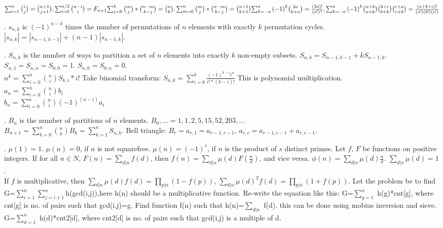 \\
${\sum_{i=1}^{n} {\binom {i}{j}} = {\binom {n+1}{j+1}}}
,  {\sum_{i=0}^{n/2} {\binom {n-i}{i}} = F_{n+1}}\\
{\sum_{j=0}^{k} {\binom {m}{j}}*{\binom {n-m}{k-j}} = {\binom {n}{k}}}
, {\sum_{m=0}^{n} {\binom {m}{j}}*{\binom {n-m}{k-j}} = {\binom {n+1}{k+1}}}\\
{\sum_{k=-a}^{a} {(-1)}^k {\binom {2a}{k+a}} = \frac{(3a)!}{(a!)^3}},  
{\sum_{k=-a}^{a} {(-1)}^k {\binom {a+b}{a+k}}{\binom {b+c}{b+k}}{\binom {c+a}{c+k}} = \frac{(a+b+c)!}{(a!)(b!)(c!)}}$

.
$s_{n,k}$ is $(-1)^{n-k}$ times the number of permutations of $n$ elements with
exactly $k$ permutation cycles.
$|s_{n,k}| = |s_{n-1,k-1}| + (n-1) |s_{n-1,k}|$.
 
.
$S_{n,k}$ is the number of ways to partition a set of $n$ elements into
exactly $k$ non-empty subsets.
$S_{n,k} = S_{n-1,k-1} + k S_{n-1,k}$.  
$S_{n,1} = S_{n,n} = S_{0,0} = 1$.
$S_{n,0} = S_{0,n} = 0$.\\
$n^{k} = \sum_{i=0}^n \binom{n}{i} S_{k,i} * i!$
Take binomial transform: $S_{n,k} = \sum_{i=0}^{k} {\frac {(-1)^{k-i} i^{n}} {i! * (k-i)!}}$
This is polynomial multiplication.\\
$a_{n} = {\sum_{i=0}^{n}} \binom {n}{i} b_{i}$\\
$b_{n} = {\sum_{i=0}^{n}} \binom {n}{i} (-1)^(n-i) a_{i}$

 
.
$B_n$ is the number of partitions of $n$ elements.
$B_0, \ldots = 1,1,2,5,15,52,203,\ldots$ \\
$B_{n+1} = \sum_{k=0}^n {n \choose k} B_k = \sum_{k=1}^n S_{n,k}$.
Bell triangle: $B_r=a_{r,1}=a_{r-1,r-1}$, $a_{r,c}=a_{r-1,c-1}+a_{r,c-1}$.
 
 
.
$\mu(1) = 1$. $\mu(n) = 0$, if $n$ is not squarefree.
$\mu(n) = (-1)^s$, if $n$ is the product of $s$ distinct primes.
Let $f$, $F$ be functions on positive integers.
If for all $n \in N$, $F(n)=\sum_{d|n} f(d)$, then $f(n) = \sum_{d|n} \mu(d) F(\frac{n}{d})$,
and vice versa. \quad
$\phi(n) = \sum_{d|n} \mu(d) \frac{n}{d}$.
\quad $\sum_{d|n} \mu(d) = 1$. \\
If $f$ is multiplicative, then $\sum_{d|n} \mu(d) f(d) = \prod_{p|n}(1-f(p))$,
$\sum_{d|n} \mu(d)^2 f(d) = \prod_{p|n} (1+f(p))$.
Let the problem be to find G=$\sum_{i=1}^n \sum_{j=i+1}^n $h(gcd(i,j)),here h(n) should be a multiplicative function.
Re-write the equation like this:  G=$\sum_{g=1}^n$ h(g)*cnt[g], where cnt[g] is no. of pairs such that gcd(i,j)=g.
Find function f(n) such that h(n)=$\sum_{d|n}$ f(d). this can be done using mobius inversion and sieve.
G=$\sum_{d=1}^n$ h(d)*cnt2[d], where cnt2[d] is no. of pairs such that gcd(i,j) is a multiple of d.
 
